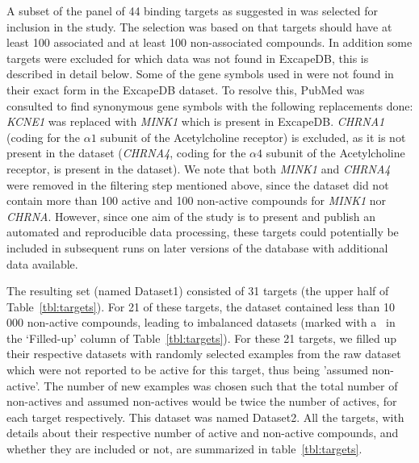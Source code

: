 \documentclass[10pt,article]{memoir}
\begin{document}
A subset of the panel of 44 binding targets as suggested in \cite{Bowes2012}
was selected for inclusion in the study. The selection was based on that
targets should have at least 100 associated and at least 100 non-associated
compounds.  In addition some targets were excluded for which data was not found
in ExcapeDB, this is described in detail below.
%
Some of the gene symbols used in \cite{Bowes2012} were not found in their exact
form in the ExcapeDB dataset. To resolve this, PubMed was consulted to find
synonymous gene symbols with the following replacements done:
%
\textit{KCNE1} was replaced with \textit{MINK1} which is present in ExcapeDB.
\textit{CHRNA1} (coding for the $\alpha1$ subunit of the Acetylcholine
receptor) is excluded, as it is not present in the dataset (\textit{CHRNA4},
coding for the $\alpha4$ subunit of the Acetylcholine receptor, is present in
the dataset). We note that both \textit{MINK1} and \textit{CHRNA4} were removed
in the filtering step mentioned above, since the dataset did not contain more
than 100 active and 100 non-active compounds for \textit{MINK1} nor
\textit{CHRNA}.  However, since one aim of the study is to present and publish
an automated and reproducible data processing, these targets could potentially
be included in subsequent runs on later versions of the database with
additional data available.

The resulting set (named Dataset1) consisted of 31 targets (the upper half of
Table~\ref{tbl:targets}).  For 21 of these targets, the dataset contained less
than 10\,000 non-active compounds, leading to imbalanced datasets (marked with
a \checkmark\ in the `Filled-up' column of Table~\ref{tbl:targets}).
%
For these 21 targets, we filled up their respective datasets with randomly
selected examples from the raw dataset which were not reported to be active for
this target, thus being 'assumed non-active'. The number of new examples was
chosen such that the total number of non-actives and assumed non-actives would
be twice the number of actives, for each target respectively. This dataset was
named Dataset2.
%
All the targets, with details about their respective number of active and
non-active compounds, and whether they are included or not, are summarized in
table~\ref{tbl:targets}.
\end{document}
